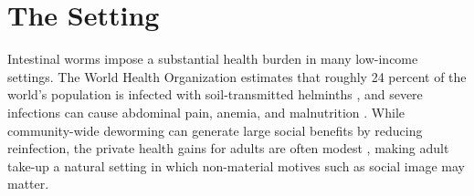 \documentclass[12pt,a4paper]{article}
\begin{document}

\section{The Setting} \label{setting}


Intestinal worms impose a substantial health burden in many low-income settings. The World Health Organization estimates that roughly 24 percent of the world’s population is infected with soil-transmitted helminths \citeyearpar{who2023}, and severe infections can cause abdominal pain, anemia, and malnutrition \citep{hotez2008helminth}. While community-wide deworming can generate large social benefits by reducing reinfection, the private health gains for adults are often modest \citep{CHAN1997438,ahuja2015should}, making adult take-up a natural setting in which non-material motives such as social image may matter.
\end{document}
